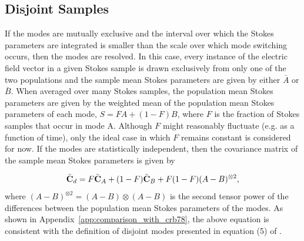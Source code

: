 \documentclass[twocolumn]{aastex6}
\newcommand{\App}[1]{Appendix~\ref{app:#1}}
\newcommand{\outerDiff}[2]{\ensuremath{({#1}-{#2})^{\otimes 2}}}
\begin{document}
\subsection{Disjoint Samples}
\label{sec:disjoint}

If the modes are mutually exclusive and the interval over which the
Stokes parameters are integrated is smaller than the scale over which
mode switching occurs, then the modes are resolved.
%
In this case, every instance of the electric field vector in a given
Stokes sample is drawn exclusively from only one of the two
populations and the sample mean Stokes parameters are given by either
$\bar A$ or $\bar B$.
%
When averaged over many Stokes samples, the population mean
Stokes parameters are given by the weighted mean of the population
mean Stokes parameters of each mode,
%
$S = F A + (1-F) B$,
%
where $F$ is the fraction of Stokes samples that occur in mode A.
%
Although $F$ might reasonably fluctuate (e.g. as a function of
time), only the ideal case in which $F$ remains constant is
considered for now.
%
If the modes are statistically independent, then the covariance matrix
of the sample mean Stokes parameters is given by
%
%
%
% 
% 
%
%
%
%
%

\begin{equation}
\bar{\bf C}_d = F \bar{\bf C}_A + (1-F) \bar{\bf C}_B + F(1-F) \outerDiff{A}{B},
\label{eqn:covariance-disjoint}
\end{equation}
%
where $\outerDiff{A}{B} = (A-B)\otimes(A-B)$ is the second tensor
power of the differences between the population mean Stokes parameters
of the modes.
%
As shown in \App{comparison_with_crb78},
the above equation is consistent with the definition of disjoint modes
presented in equation (5) of \cite{crb78}.
%

\end{document}
